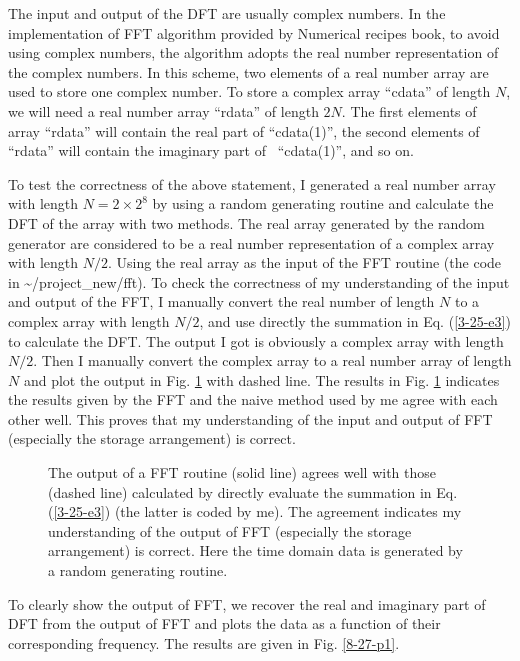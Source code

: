 \documentclass{article}
\begin{document}
The input and output of the DFT are usually complex numbers. In the
implementation of FFT algorithm provided by Numerical recipes
book{\cite{press1992}}, to avoid using complex numbers, the algorithm adopts
the real number representation of the complex numbers. In this scheme, two
elements of a real number array are used to store one complex number. To store
a complex array ``cdata'' of length $N$, we will need a real number array
``rdata'' of length $2 N$. The first elements of array ``rdata'' will contain
the real part of ``cdata(1)'', the second elements of ``rdata'' will contain
the imaginary part of \ ``cdata(1)'', and so on.

To test the correctness of the above statement, I generated a real number
array with length $N = 2 \times 2^8$ by using a random generating routine and
calculate the DFT of the array with two methods. The real array generated by
the random generator are considered to be a real number representation of a
complex array with length $N / 2$. Using the real array as the input of the
FFT routine (the code in \~{}/project\_new/fft). To check the correctness of
my understanding of the input and output of the FFT, I manually convert the
real number of length $N$ to a complex array with length $N / 2$, and use
directly the summation in Eq. (\ref{3-25-e3}) to calculate the DFT. The output
I got is obviously a complex array with length $N / 2$. Then I manually
convert the complex array to a real number array of length $N$ and plot the
output in Fig. \ref{3-25-e8} with dashed line. The results in Fig.
\ref{3-25-e8} indicates the results given by the FFT and the naive method used
by me agree with each other well. This proves that my understanding of the
input and output of FFT (especially the storage arrangement) is correct.

\begin{figure}[h]
  \caption{\label{3-25-e8}The output of a FFT routine (solid line) agrees well
  with those (dashed line) calculated by directly evaluate the summation in
  Eq. (\ref{3-25-e3}) (the latter is coded by me). The agreement indicates my
  understanding of the output of FFT (especially the storage arrangement) is
  correct. Here the time domain data is generated by a random generating
  routine. }
\end{figure}

To clearly show the output of FFT, we recover the real and imaginary part of
DFT from the output of FFT and plots the data as a function of their
corresponding frequency. The results are given in Fig. \ref{8-27-p1}.
\end{document}
